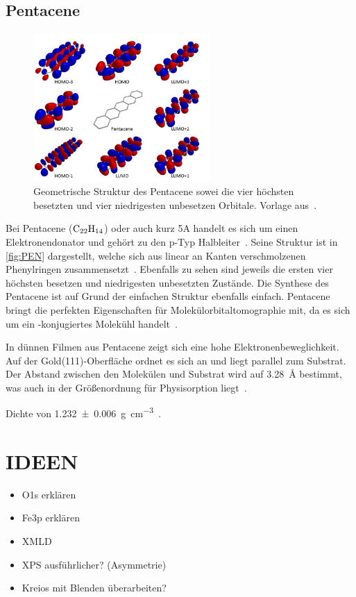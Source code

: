         \subsection{Pentacene} \label{sec:5A}         
            \begin{figure}
                \centering
                \includegraphics[width=0.6\textwidth]{./content/pictures/PEN.jpg}
                \caption{Geometrische Struktur des Pentacene sowei die vier höchsten besetzten und vier niedrigesten unbesetzen Orbitale. Vorlage aus~\cite{PEN}.}
                \label{fig:PEN}
            \end{figure}
            Bei Pentacene ($\ce{C22H14}$) oder auch kurz 5A handelt es sich um einen Elektronendonator und gehört zu den p-Typ Halbleiter~\cite{5A_1}.
            Seine Struktur ist in \autoref{fig:PEN} dargestellt, welche sich aus linear an Kanten verschmolzenen Phenylringen zusammensetzt~\cite{MM_2}.
            Ebenfalls zu sehen sind jeweils die ersten vier höchsten besetzen und niedrigesten unbesetzten Zustände.
            Die Synthese des Pentacene ist auf Grund der einfachen Struktur ebenfalls einfach.
            Pentacene bringt die perfekten Eigenschaften für Molekülorbitaltomographie mit, da es sich um ein \pi-konjugiertes Molekühl handelt~\cite{MM_2}.

            In dünnen Filmen aus Pentacene zeigt sich eine hohe Elektronenbeweglichkeit.
            Auf der Gold(111)-Oberfläche ordnet es sich an und liegt parallel zum Substrat.
            Der Abstand zwischen den Molekülen und Substrat wird auf \SI{3.28}{\angstrom} bestimmt, was auch in der Größenordnung für Physisorption liegt~\cite{5A_1}.
            

            Dichte von \SI{1.232(6)}{\gram\per\cubic\centi\meter}~\cite{CAS}.

            \section{IDEEN}
            \begin{itemize}
                \item O1s erklären
                \item Fe3p erklären 
                \item XMLD
                \item XPS ausführlicher? (Asymmetrie)
                \item Kreios mit Blenden überarbeiten?
            \end{itemize}
            